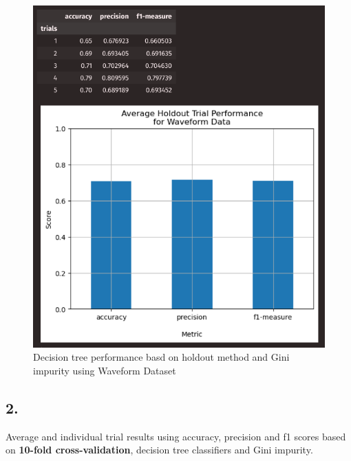 \documentclass{article}
\begin{document}
\begin{figure}[H]
\begin{minipage}[t]{0.47\textwidth}
            \includegraphics[width=\textwidth, height=0.35\textheight]{1hw.png}
            \caption{Decision tree performance basd on holdout method and Gini impurity using Waveform Dataset}
        \end{minipage}
    \end{figure}

    \newpage

    \subsection*{2.}

    Average and individual trial results using accuracy, precision and f1 scores based on \textbf{10-fold cross-validation}, decision tree
    classifiers and Gini impurity.
\end{document}
